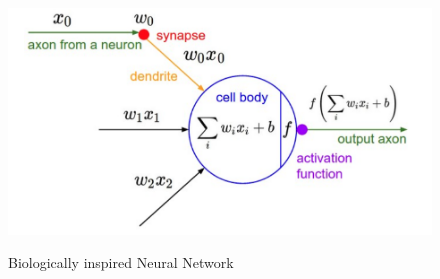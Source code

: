 \begin{figure}[h]
	\begin{center}
		\includegraphics[height=.28\textheight]{Chuong2/Figs/NeuralNetwork.png}
		\label{fig:Neural_Network}
		\caption{Biologically inspired Neural Network \cite{karparthy}}
	\end{center}
\end{figure}

